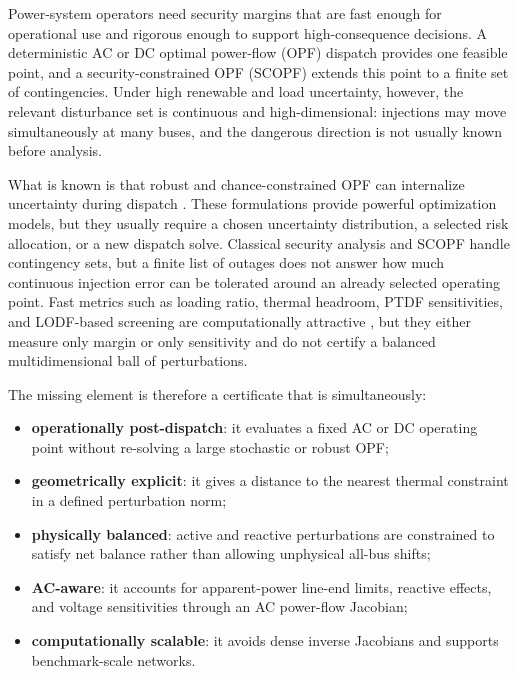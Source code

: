 \documentclass[11pt]{article}
\begin{document}
Power-system operators need security margins that are fast enough for operational use and rigorous enough to support high-consequence decisions. A deterministic AC or DC optimal power-flow (OPF) dispatch provides one feasible point, and a security-constrained OPF (SCOPF) extends this point to a finite set of contingencies. Under high renewable and load uncertainty, however, the relevant disturbance set is continuous and high-dimensional: injections may move simultaneously at many buses, and the dangerous direction is not usually known before analysis.

What is known is that robust and chance-constrained OPF can internalize uncertainty during dispatch \citep{BertsimasSim2004,BenTalNemirovski1998,BienstockChertkovHarnett2014,RoaldEtAl2016,LubinBackhausDvorkin2016}. These formulations provide powerful optimization models, but they usually require a chosen uncertainty distribution, a selected risk allocation, or a new dispatch solve. Classical security analysis and SCOPF handle contingency sets, but a finite list of outages does not answer how much continuous injection error can be tolerated around an already selected operating point. Fast metrics such as loading ratio, thermal headroom, PTDF sensitivities, and LODF-based screening are computationally attractive \citep{WoodWollenbergSheble2013}, but they either measure only margin or only sensitivity and do not certify a balanced multidimensional ball of perturbations.

The missing element is therefore a certificate that is simultaneously:
\begin{itemize}[leftmargin=*]
  \item \textbf{operationally post-dispatch}: it evaluates a fixed AC or DC operating point without re-solving a large stochastic or robust OPF;
  \item \textbf{geometrically explicit}: it gives a distance to the nearest thermal constraint in a defined perturbation norm;
  \item \textbf{physically balanced}: active and reactive perturbations are constrained to satisfy net balance rather than allowing unphysical all-bus shifts;
  \item \textbf{AC-aware}: it accounts for apparent-power line-end limits, reactive effects, and voltage sensitivities through an AC power-flow Jacobian;
  \item \textbf{computationally scalable}: it avoids dense inverse Jacobians and supports benchmark-scale networks.
\end{itemize}
\end{document}
